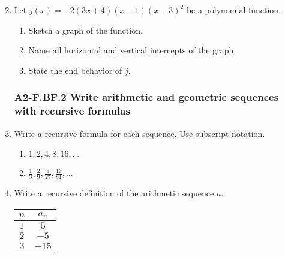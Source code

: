 \documentclass[12pt, twoside]{article}
\begin{document}
\begin{enumerate}
\begin{multicols}{2}
    \columnbreak
    \end{multicols}

\item Let $j(x)=-2(3x+4)(x-1)(x-3)^2$ be a polynomial function. 
    \begin{center}
    \end{center}
    \begin{enumerate}
        \item Sketch a graph of the function.
        \item Name all horizontal and vertical intercepts of the graph.
        \item State the end behavior of $j$.
    \end{enumerate}
        
\newpage
\subsubsection*{A2-F.BF.2 Write arithmetic and geometric sequences with recursive formulas}
\item Write a recursive formula for each sequence. Use subscript notation.
    \begin{multicols}{2}
    \begin{enumerate}
        \item $1, 2, 4, 8, 16, \dots$
        \item $\displaystyle \frac{1}{3}, \frac{2}{9}, \frac{8}{27}, \frac{16}{81},  \dots$ 
    \end{enumerate}
    \end{multicols} \vspace{4cm}

\item Write a recursive definition of the arithmetic sequence $a$. \\[0.5cm]
\renewcommand{\arraystretch}{1.5}
\begin{tabular}{|c|c|}
\hline
$n$ & $a_n$ \\
\hline
$1$ & $5$ \\
$2$ & $-5$ \\
$3$ & $-15$ \\
\hline
\end{tabular} \vspace{1cm}


\end{enumerate}
\end{document}
